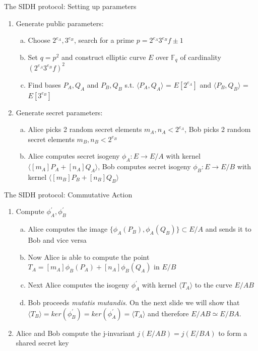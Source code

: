 \documentclass{beamer}
\begin{document}
\begin{frame}{The SIDH protocol: Setting up parameters}
\begin{enumerate}[1.]
	\item Generate public parameters:
	\begin{enumerate}[(a)]
		\item Choose $2^{e_A},3^{e_B}$, search for a prime $p=2^{e_A}3^{e_B}f\pm 1$ %
		\item Set $q=p^2$ and construct elliptic curve $E$ over $\mathbb{F}_q$ of cardinality $(2^{e_A}3^{e_B}f)^2$ %
		\item Find bases $P_A,Q_A$ and $P_B,Q_B$ s.t. $\langle P_A,Q_A\rangle$ = $E[2^{e_A}]$ and $\langle P_B,Q_B\rangle$ = $E[3^{e_B}]$ %
	\end{enumerate}
	\item Generate secret parameters:
	\begin{enumerate}[(a)]
		\item Alice picks 2 random secret elements $m_A,n_A < 2^{e_A}$, Bob picks 2 random secret elements $m_B,n_B < 2^{e_B}$
		\item Alice computes secret isogeny $\phi_A : E \to E/A$ with kernel $\langle [m_A]P_A+[n_A]Q_A\rangle$, Bob computes secret isogeny $\phi_B : E \to E/B$ with kernel $\langle [m_B]P_B+[n_B]Q_B\rangle$
	\end{enumerate}

\end{enumerate}
\end{frame}

\begin{frame}{The SIDH protocol: Commutative Action}

\begin{enumerate}[1.]
	\item Compute $\phi_A^{\prime},\phi_B^{\prime}$

	\begin{enumerate}[(a)]
		\item Alice computes the image $\{\phi_A(P_B),\phi_A(Q_B)\} \subset E/A$ and sends it to Bob and vice versa
		\item Now Alice is able to compute the point $T_A=[m_A]\phi_B(P_A) + [n_A]\phi_B(Q_A)$ in $E/B$
		\item Next Alice computes the isogeny $\phi_A^{\prime}$ with kernel $\langle T_A \rangle$ to the curve $E/AB$
		\item Bob proceeds \textit{mutatis mutandis}. On the next slide we will show that $\langle T_B \rangle  = ker(\phi_B^{\prime})=ker(\phi_A^{\prime})=\langle T_A \rangle$ and therefore $E/AB \simeq E/BA$.
	\end{enumerate}
	\item Alice and Bob compute the j-invariant $j(E/AB)=j(E/BA)$ to form a shared secret key 
\end{enumerate}
\end{frame}
\end{document}
